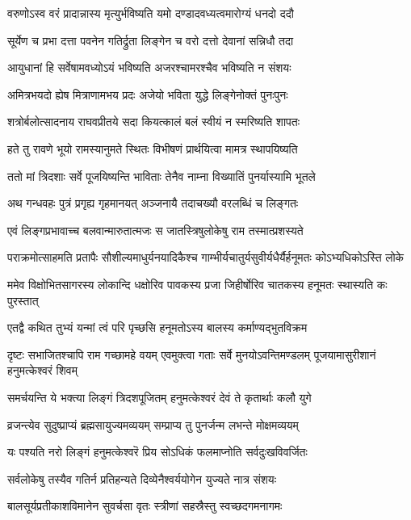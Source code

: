 \twolineshloka
{वरुणोऽस्व वरं प्रादान्नास्य मृत्युर्भविष्यति}
{यमो दण्डादवध्यत्वमारोग्यं धनदो ददौ}%

\twolineshloka
{सूर्येण च प्रभा दत्ता पवनेन गतिर्द्रुता}
{लिङ्गेन च वरो दत्तो देवानां सन्निधौ तदा}%

\twolineshloka
{आयुधानां हि सर्वेषामवध्योऽयं भविष्यति}
{अजरश्चामरश्चैव भविष्यति न संशयः}%

\twolineshloka
{अमित्रभयदो ह्येष मित्राणामभय प्रदः}
{अजेयो भविता युद्धे लिङ्गेनोक्तं पुनःपुनः}%

\twolineshloka
{शत्रोर्बलोत्सादनाय राघवप्रीतये सदा}
{कियत्कालं बलं स्वीयं न स्मरिष्यति शापतः}%

\twolineshloka
{हते तु रावणे भूयो रामस्यानुमते स्थितः}
{विभीषणं प्रार्थयित्वा मामत्र स्थापयिष्यति}%

\twolineshloka
{ततो मां त्रिदशाः सर्वे पूजयिष्यन्ति भाविताः}
{तेनैव नाम्ना विख्यातिं पुनर्यास्यामि भूतले}%

\twolineshloka
{अथ गन्धवहः पुत्रं प्रगृह्य गृहमानयत्}
{अञ्जनायै तदाचख्यौ वरलब्धिं च लिङ्गतः}%

\twolineshloka
{एवं लिङ्गप्रभावाच्च बलवान्मारुतात्मजः}
{स जातस्त्रिषुलोकेषु राम तस्मात्प्रशस्यते}%

\twolineshloka
{पराक्रमोत्साहमति प्रतापैः सौशील्यमाधुर्यनयादिकैश्च}
{गाम्भीर्यचातुर्यसुवीर्यधैर्यैर्हनूमतः कोऽभ्यधिकोऽस्ति लोके}%

\twolineshloka
{ममेव विक्षोभितसागरस्य लोकान्दि धक्षोरिव पावकस्य}
{प्रजा जिहीर्षोरिव चातकस्य हनूमतः स्थास्यति कः पुरस्तात्}%

\twolineshloka
{एतद्वै कथित तुभ्यं यन्मां त्वं परि पृच्छसि}
{हनूमतोऽस्य बालस्य कर्माण्यद्भुतविक्रम}%

\threelineshloka
{दृष्टः सभाजितश्चापि राम गच्छामहे वयम्}
{एवमुक्त्वा गताः सर्वे मुनयोऽवन्तिमण्डलम्}
{पूजयामासुरीशानं हनुमत्केश्वरं शिवम्}

\twolineshloka
{समर्चयन्ति ये भक्त्या लिङ्गं त्रिदशपूजितम्}
{हनुमत्केश्वरं देवं ते कृतार्थाः कलौ युगे}%

\twolineshloka
{व्रजन्त्येव सुदुष्प्राप्यं ब्रह्मसायुज्यमव्ययम्}
{सम्प्राप्य तु पुनर्जन्म लभन्ते मोक्षमव्ययम्}%

\twolineshloka
{यः पश्यति नरो लिङ्गं हनुमत्केश्वरॆ प्रिय}
{सोऽधिकं फलमाप्नोति सर्वदुःखविवर्जितः}%

\twolineshloka
{सर्वलोकेषु तस्यैव गतिर्न प्रतिहन्यते}
{दिव्येनैश्वर्ययोगेन युज्यते नात्र संशयः}%

\twolineshloka
{बालसूर्यप्रतीकाशविमानेन सुवर्चसा}
{वृतः स्त्रीणां सहस्रैस्तु स्वच्छदगमनागमः}%

